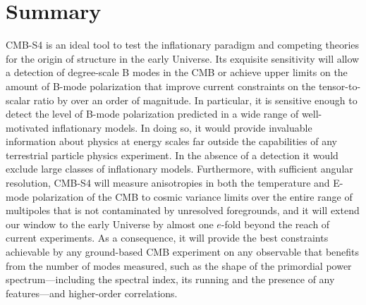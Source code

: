  
\section{Summary}
\label{sec:summary}
CMB-S4 is an ideal tool to test the inflationary paradigm and competing theories for the origin of structure in the early Universe. Its exquisite sensitivity will allow a detection of degree-scale B modes in the CMB or achieve upper limits on the amount of B-mode polarization that improve current constraints on the tensor-to-scalar ratio by over an order of magnitude. In particular, it is sensitive enough to detect the level of B-mode polarization predicted in a wide range of well-motivated inflationary models. In doing so, it would provide invaluable information about physics at energy scales far outside the capabilities of any terrestrial particle physics experiment. In the absence of a detection it would exclude large classes of inflationary models. Furthermore, with sufficient angular resolution, CMB-S4 will measure anisotropies in both the temperature and E-mode polarization of the CMB to cosmic variance limits over the entire range of multipoles that is not contaminated by unresolved foregrounds, and it will extend our window to the early Universe by almost one $e$-fold beyond the reach of current experiments. As a consequence, it will provide the best constraints achievable by any ground-based CMB experiment on any observable that benefits from the number of modes measured, such as the shape of the primordial power spectrum---including the spectral index, its running and the presence of any features---and higher-order correlations.


 
